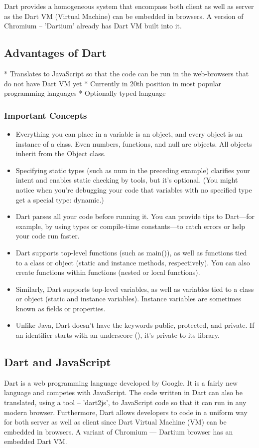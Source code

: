   Dart provides a homogeneous system that encompass both client as well as server as the Dart VM (Virtual Machine) can be embedded in browsers. A version of Chromium – ’Dartium’ already has Dart VM built into it.

  \subsection{Advantages of Dart}
  * Translates to JavaScript so that the code can be run in the web-browsers that do not have Dart VM yet
  * Currently in 20th position in most popular programming languages
  * Optionally typed language

  \subsubsection{Important Concepts}
  \begin{itemize}
  \item Everything you can place in a variable is an object, and every object is an instance of a class. Even numbers, functions, and null are objects. All objects inherit from the Object class.
  \item Specifying static types (such as num in the preceding example) clarifies your intent and enables static checking by tools, but it’s optional. (You might notice when you’re debugging your code that variables with no specified type get a special type: dynamic.)
  \item Dart parses all your code before running it. You can provide tips to Dart—for example, by using types or compile-time constants—to catch errors or help your code run faster.
  \item Dart supports top-level functions (such as main()), as well as functions tied to a class or object (static and instance methods, respectively). You can also create functions within functions (nested or local functions).
  \item Similarly, Dart supports top-level variables, as well as variables tied to a class or object (static and instance variables). Instance variables are sometimes known as fields or properties.
  \item Unlike Java, Dart doesn’t have the keywords public, protected, and private. If an identifier starts with an underscore (\textunderscore), it’s private to its library.
  \end{itemize}

  \subsection{Dart and JavaScript}
  Dart is a web programming language developed by Google. It is a fairly new language and competes with JavaScript. The code written in Dart can also be translated, using a tool – ’dart2js’, to JavaScript code so that it can run in any modern browser. Furthermore, Dart allows developers to code in a uniform way for both server as well as client since Dart Virtual Machine (VM) can be embedded in browsers. A variant of Chromium — Dartium browser has an embedded Dart VM.

